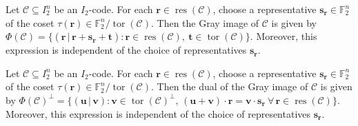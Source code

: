 \documentclass[10pt,a4paper]{amsart}
\begin{document}
\begin{theorem}   \label{thm:GrayImageGeneral}
Let $\mathcal{C} \subseteq I_2^n$ be an $I_2$-code. For each
$\mathbf{r} \in \operatorname{res}(\mathcal{C})$, choose a representative
$\mathbf{s}_{\mathbf{r}} \in \mathbb{F}_2^n$ of the coset
$\tau (\mathbf{r}) \in \mathbb{F}_2^n / \operatorname{tor}(\mathcal{C})$. Then the Gray image of
$\mathcal{C}$ is given by
$
\Phi(\mathcal{C})
=
\{
(\mathbf{r} \, | \,  \mathbf{r} + \mathbf{s}_{\mathbf{r}} + \mathbf{t})
\mathrel{:}
\mathbf{r} \in \operatorname{res}(\mathcal{C}), \
\mathbf{t} \in \operatorname{tor}(\mathcal{C})
\}
$.
Moreover, this expression is independent of the choice of representatives $\mathbf{s}_{\mathbf{r}}$.
\end{theorem}

\begin{theorem}   \label{thm:dual-phi}
Let $\mathcal{C} \subseteq I_2^n$ be an $I_2$-code. For each
$\mathbf{r} \in \operatorname{res}(\mathcal{C})$, choose a representative
$\mathbf{s}_{\mathbf{r}} \in \mathbb{F}_2^n$ of the coset
$\tau (\mathbf{r}) \in \mathbb{F}_2^n / \operatorname{tor}(\mathcal{C})$. Then the dual of the Gray image of $\mathcal{C}$ is given by
$
\Phi(\mathcal{C})^\perp
=
\{
(\mathbf{u} \, | \, \mathbf{v})    \mathrel{:}
\mathbf{v} \in \operatorname{tor} ( \mathcal{C} )^\perp
,  \,
(\mathbf{u} + \mathbf{v}) \cdot \mathbf{r}
=
\mathbf{v} \cdot \mathbf{s}_{\mathbf{r}}  \
\forall \, \mathbf{r} \in \operatorname{res} ( \mathcal{C} )
\}
$.
Moreover, this expression is independent of the choice of representatives $\mathbf{s}_{\mathbf{r}}$.
\end{theorem}
\end{document}
